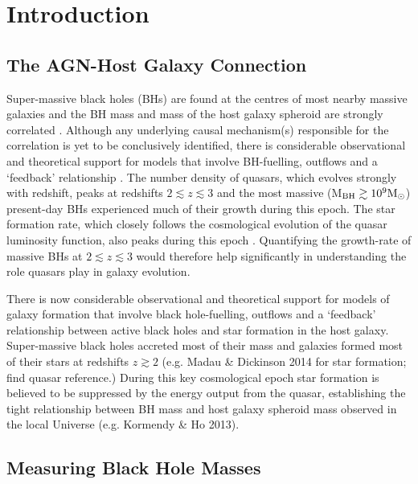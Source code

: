 
\chapter{Introduction}\label{ch:introduction}

\section{The AGN-Host Galaxy Connection}

Super-massive black holes (BHs) are found at the centres of most nearby massive galaxies and the BH mass and mass of the host galaxy spheroid are strongly correlated \citep{ferrarese00,gebhardt00,kormendy13}. 
Although any underlying causal mechanism(s) responsible for the correlation is yet to be conclusively identified, there is considerable observational and theoretical support for models that involve BH-fuelling, outflows and a `feedback' relationship \citep[e.g.][]{king15}.  
The number density of quasars, which evolves strongly with redshift, peaks at redshifts $2 \lesssim z \lesssim 3$ \citep[e.g.][]{brandt05,richards06b} and the most massive (M$_{\rm BH} \gtrsim 10^9{{{\rm M_\odot}}}$) present-day BHs experienced much of their growth during this epoch.  
The star formation rate, which closely follows the cosmological evolution of the quasar luminosity function, also peaks during this epoch \citep[e.g.][]{boyle98}. 
Quantifying the growth-rate of massive BHs at $2 \lesssim z \lesssim 3$ would therefore help significantly in understanding the role quasars play in galaxy evolution.

There is now considerable observational and theoretical support for models of galaxy formation that involve black hole-fuelling, outflows and a ‘feedback’ relationship between active black holes and star formation in the host galaxy. 
Super-massive black holes accreted most of their mass and galaxies formed most of their stars at redshifts $z\gtrsim2$ (e.g. Madau \& Dickinson 2014 for star formation; find quasar reference.)
During this key cosmological epoch star formation is believed to be suppressed by the energy output from the quasar, establishing the tight relationship between BH mass and host galaxy spheroid mass observed in the local Universe (e.g. Kormendy \& Ho 2013). 

\section{Measuring Black Hole Masses}

